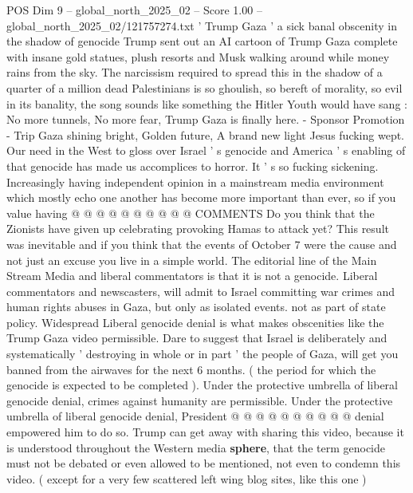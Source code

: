 \begin{textsample}{POS Dim 9 – global\_north\_2025\_02 – Score 1.00 – global\_north\_2025\_02/121757274.txt}  \label{ex:f9_pos_436}
' Trump Gaza ' a sick banal obscenity in the shadow of genocide Trump sent out an AI cartoon of Trump Gaza complete with insane gold statues, plush resorts and Musk walking around while money rains from the sky.
The narcissism required to spread this in the shadow of a quarter of a million dead Palestinians is so ghoulish, so bereft of morality, so evil in its banality, the song sounds like something the Hitler Youth would have sang : No more tunnels, No more fear, Trump Gaza is finally here. - Sponsor Promotion - Trip Gaza shining bright, Golden future, A brand new light Jesus fucking wept.
Our need in the West to gloss over Israel ' s genocide and America ' s enabling of that genocide has made us accomplices to horror.
It ' s so fucking sickening.
Increasingly having independent opinion in a mainstream media environment which mostly echo one another has become more important than ever, so if you value having @ @ @ @ @ @ @ @ @ @ COMMENTS Do you think that the Zionists have given up celebrating provoking Hamas to attack yet?
This result was inevitable and if you think that the events of October 7 were the cause and not just an excuse you live in a simple world.
The editorial line of the Main Stream Media and liberal commentators is that it is not a genocide.
Liberal commentators and newscasters, will admit to Israel committing war crimes and human rights abuses in Gaza, but only as isolated events. not as part of state policy.
Widespread Liberal genocide denial is what makes obscenities like the Trump Gaza video permissible.
Dare to suggest that Israel is deliberately and systematically ' destroying in whole or in part ' the people of Gaza, will get you banned from the airwaves for the next 6 months. ( the period for which the genocide is expected to be completed ).
Under the protective umbrella of liberal genocide denial, crimes against humanity are permissible.
Under the protective umbrella of liberal genocide denial, President @ @ @ @ @ @ @ @ @ @ denial empowered him to do so.
Trump can get away with sharing this video, because it is understood throughout the Western media \textbf{sphere}, that the term genocide must not be debated or even allowed to be mentioned, not even to condemn this video. ( except for a very few scattered left wing blog sites, like this one )

\end{textsample}
